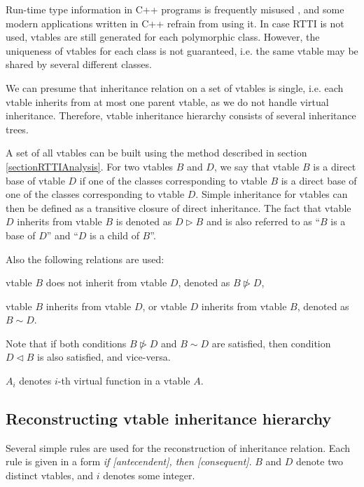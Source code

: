 \documentclass[10pt, conference]{IEEEtran}
\newcommand{\nrhd}{\ntriangleright}
\renewenvironment{itemize}{
    \begin{list}{\labelitemi}{\leftmargin=1.0em \itemindent=-0.4em \itemsep=-\parsep}
}{
	\end{list}
}
\begin{document}
Run-time type information in C++ programs
is frequently misused \cite{stroustrup93},
and some modern applications written in C++ refrain from using it.
In case RTTI is not used, vtables are still generated for each polymorphic class.
However, the uniqueness of vtables for each class %
is not guaranteed, i.e. the same vtable
may be shared by several different classes.

We can presume that inheritance relation on a set of vtables is single,
i.e. each vtable inherits from at most one parent vtable,
as we do not handle virtual inheritance. Therefore, vtable inheritance hierarchy
consists of several inheritance trees.

A set of all vtables
can be built using the method described in section \ref{sectionRTTIAnalysis}.
For two vtables $B$ and $D$, we say that vtable $B$ is a direct base of vtable $D$ if
one of the classes corresponding to vtable $B$ is a direct base of one of
the classes corresponding to vtable $D$.
Simple inheritance for vtables can then be defined as a transitive
closure of direct inheritance. The fact that vtable $D$ inherits
from vtable $B$ is denoted as $D \rhd B$ and is also referred to as
``$B$ is a base of $D$'' and ``$D$ is a child of $B$''.

Also the following relations are used:
\begin{itemize}
\item vtable $B$ does not inherit from vtable $D$, denoted as $B \nrhd D$,
\item vtable $B$ inherits from vtable $D$, or vtable $D$ inherits from vtable $B$, denoted as $B \sim D$.
\end{itemize}
Note that if both conditions $B \nrhd D$ and $B \sim D$ are satisfied,
then condition $D \lhd B$ is also satisfied, and vice-versa.

$A_i$ denotes $i$-th virtual function in a vtable $A$.





\subsection{Reconstructing vtable inheritance hierarchy}
Several simple rules are used for the reconstruction of inheritance relation.
Each rule is given in a form \textit{if [antecendent], then [consequent]}.
$B$ and $D$ denote two distinct vtables, and $i$ denotes some integer.
\end{document}
